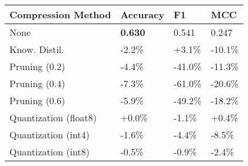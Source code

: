 \begin{tabular}{llll}
\toprule
\textbf{Compression Method} & \textbf{Accuracy} & \textbf{F1} & \textbf{MCC} \\
\midrule
None & \textbf{0.630} & 0.541 & 0.247 \\
Know. Distil. & -2.2\% & +3.1\% & -10.1\% \\
Pruning (0.2) & -4.4\% & -41.0\% & -11.3\% \\
Pruning (0.4) & -7.3\% & -61.0\% & -20.6\% \\
Pruning (0.6) & -5.9\% & -49.2\% & -18.2\% \\
Quantization (float8) & +0.0\% & -1.1\% & +0.4\% \\
Quantization (int4) & -1.6\% & -4.4\% & -8.5\% \\
Quantization (int8) & -0.5\% & -0.9\% & -2.4\% \\
\bottomrule
\end{tabular}
